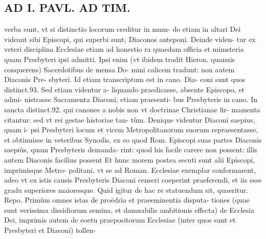 \documentclass{article}
\begin{document}
\begin{pages}
\section*{AD I. PAVL. AD TIM. }
\marginpar{[ p.158 ]}\pstart verba sunt, vt si distinctio locorum creditur in mum- do etiam in altari Dei videant sibi Episcopi, qui superbi sunt, Diaconos anteponi. Deinde viden- tur ex veteri disciplina Ecclesiae etiam ad honestio ra quaedam officia et mimsteria quam Presbyteri ipsi admitti. Ipsi enim (vt ibidem tradit Hieron. quanuis conquerens) Sacerdotibus de mensa Do- mini calicem tradunt: non autem Diaconis Pre- sbyteri. Id etiam transcriptum est in cano. Dia- coni sunt quos distinct.93. Sed etiam videntur a- liquando praedicasse, absente Episcopo, et admi- nistrasse Sacramenta Diaconi, etiam praesenti- bus Presbyteris in cano. In sancta distinct.92. qui canones a nobis non vt doctrinae Christianae fir- mamenta citantur: sed vt rei gestae historiae tan- tùm. Denique videntur Diaconi saepius, quam i- psi Presbyteri locum et vicem Metropolitanorum suorum repraesentasse, et obtinuisse in veteribus Synodis, ex eo quod Rom. Episcopi suas partes Diaconis saepiùs, quam Presbyteris demanda- rint: quod his facile carere non possent: illis autem Diaconis facilius possent Et hunc morem postea secuti sunt alii Episcopi, imprimisque Metro- politani, vt se ad Roman. Ecclesiae exemplar conformarent, adeo vt ex istis causis Presbyteris Diaconi censeri coeperint praeferendi, et iis esse gradu superiores maioresque. Quid igitur de hac re statuendum sit, quaeritur. Repo. Primùm omnes istas de proëdria et praeeminentia disputa- tiones (quae sunt verissima dissidiorum semina, et damnabilis ambitionis effecta) de Ecclesia Dei, imprimis autem de eoetu praepositorum Ecclesiae (inter quos sunt et Presbyteri et Diaconi) tollen-  \pend

\end{pages}
\end{document}

